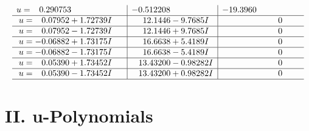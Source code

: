 \documentclass[1p]{elsarticle_modified}
\theoremstyle{definition}
\begin{document}
$$\begin{array}{c|c|c}
\begin{aligned}
u &= \phantom{-}0.290753\phantom{ +0.000000I}\end{aligned}
 & -0.512208\phantom{ +0.000000I} & -19.3960\phantom{ +0.000000I} \\ \hline\begin{aligned}
u &= \phantom{-}0.07952 + 1.72739 I\end{aligned}
 & \phantom{-}12.1446 - 9.7685 I & \phantom{-0.000000 } 0 \\ \hline\begin{aligned}
u &= \phantom{-}0.07952 - 1.72739 I\end{aligned}
 & \phantom{-}12.1446 + 9.7685 I & \phantom{-0.000000 } 0 \\ \hline\begin{aligned}
u &= -0.06882 + 1.73175 I\end{aligned}
 & \phantom{-}16.6638 + 5.4189 I & \phantom{-0.000000 } 0 \\ \hline\begin{aligned}
u &= -0.06882 - 1.73175 I\end{aligned}
 & \phantom{-}16.6638 - 5.4189 I & \phantom{-0.000000 } 0 \\ \hline\begin{aligned}
u &= \phantom{-}0.05390 + 1.73452 I\end{aligned}
 & \phantom{-}13.43200 - 0.98282 I & \phantom{-0.000000 } 0 \\ \hline\begin{aligned}
u &= \phantom{-}0.05390 - 1.73452 I\end{aligned}
 & \phantom{-}13.43200 + 0.98282 I & \phantom{-0.000000 } 0\\
 \hline 
 \end{array}$$\newpage
\newpage\renewcommand{\arraystretch}{1}
\centering \section*{ II. u-Polynomials}
\end{document}
